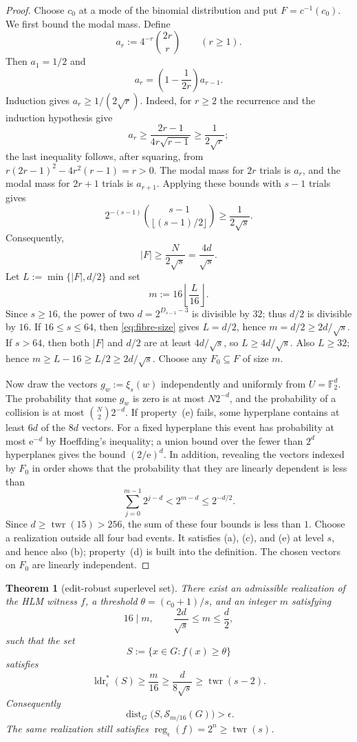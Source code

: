 \documentclass[11pt]{article}
\theoremstyle{plain}
\newtheorem{theorem}{Theorem}
\theoremstyle{definition}
\numberwithin{theorem}{section}
\newcommand{\F}{\mathbb{F}}
\newcommand{\abs}[1]{\lvert #1\rvert}
\newcommand{\twr}{\operatorname{twr}}
\newcommand{\ldrs}{\operatorname{ldr}^{*}}
\newcommand{\reg}{\operatorname{reg}}
\newcommand{\Stable}{\mathcal{S}}
\newcommand{\econst}{\mathrm e}
\begin{document}
\begin{proof}
Choose $c_0$ at a mode of the binomial distribution and put
$F=c^{-1}(c_0)$.  We first bound the modal mass.  Define
\[
  a_r:=4^{-r}\binom{2r}{r}\qquad(r\ge1).
\]
Then $a_1=1/2$ and
\[
  a_r=\left(1-\frac1{2r}\right)a_{r-1}.
\]
Induction gives $a_r\ge1/(2\sqrt r)$.  Indeed, for $r\ge2$ the recurrence
and the induction hypothesis give
\[
  a_r\ge\frac{2r-1}{4r\sqrt{r-1}}\ge\frac1{2\sqrt r};
\]
the last inequality follows, after squaring, from
$r(2r-1)^2-4r^2(r-1)=r>0$.  The modal mass for $2r$ trials is $a_r$, and the
modal mass for $2r+1$ trials is $a_{r+1}$.  Applying these bounds with
$s-1$ trials gives
\[
  2^{-(s-1)}\binom{s-1}{\lfloor(s-1)/2\rfloor}
  \ge\frac1{2\sqrt{s}}.
\]
Consequently,
\begin{equation}\label{eq:fibre-size}
  \abs F\ge\frac{N}{2\sqrt{s}}=\frac{4d}{\sqrt{s}}.
\end{equation}
Let $L:=\min\{\abs F,d/2\}$ and set
\[
  m:=16\left\lfloor\frac{L}{16}\right\rfloor.
\]
Since $s\ge16$, the power of two $d=2^{D_{s-1}-3}$ is divisible by $32$;
thus $d/2$ is divisible by $16$.  If $16\le s\le64$, then \eqref{eq:fibre-size} gives $L=d/2$, hence
$m=d/2\ge2d/\sqrt{s}$.  If $s>64$, then both $\abs F$ and $d/2$ are at
least $4d/\sqrt{s}$, so $L\ge4d/\sqrt{s}$.  Also $L\ge32$; hence
$m\ge L-16\ge L/2\ge2d/\sqrt{s}$.  Choose any
$F_0\subseteq F$ of size $m$.

Now draw the vectors $g_w:=\xi_s(w)$ independently and uniformly from
$U=\F_2^d$.  The probability that some $g_w$ is zero is at most $N2^{-d}$, and the
probability of a collision is at most $\binom{N}{2}2^{-d}$.  If
property~\textup{(e)} fails, some hyperplane contains at least $6d$ of the
$8d$ vectors.  For a fixed hyperplane this event has probability at most
$\econst^{-d}$ by Hoeffding's inequality; a union bound over the fewer than
$2^d$ hyperplanes gives the bound $(2/\econst)^d$.  In addition, revealing the vectors indexed by
$F_0$ in order shows that the probability that they are linearly dependent is
less than
\[
  \sum_{j=0}^{m-1}2^{j-d}<2^{m-d}\le2^{-d/2}.
\]
Since $d\ge\twr(15)>256$, the sum of these four bounds is less than $1$.
Choose a realization outside all four bad events.  It satisfies
\textup{(a)}, \textup{(c)}, and \textup{(e)} at level $s$, and hence also
\textup{(b)}; property~\textup{(d)} is built into the definition.  The
chosen vectors on $F_0$ are linearly independent.
\end{proof}

\begin{theorem}[edit-robust superlevel set]\label{thm:witness}
There exist an admissible realization of the HLM witness $f$, a threshold
$\theta=(c_0+1)/s$, and an integer $m$ satisfying
\[
  16\mid m,\qquad \frac{2d}{\sqrt{s}}\le m\le\frac d2,
\]
such that the set
\[
  S:=\{x\in G:f(x)\ge\theta\}
\]
satisfies
\[
  \ldrs_\epsilon(S)\ge\frac{m}{16}
  \ge\frac{d}{8\sqrt{s}}
  \ge\twr(s-2).
\]
Consequently
\[
  \operatorname{dist}_G\bigl(S,\Stable_{m/16}(G)\bigr)>\epsilon.
\]
The same realization still satisfies
$\reg_\epsilon(f)=2^n\ge\twr(s)$.
\end{theorem}
\end{document}
